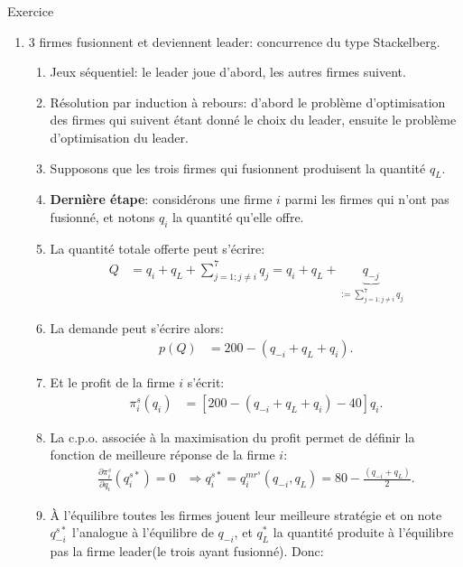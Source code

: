 \begin{frame}[allowframebreaks]{Exercice}
\begin{enumerate}
        \item 3 firmes fusionnent et deviennent leader: concurrence du type Stackelberg. 
        \begin{enumerate}[$\star$]
            \item Jeux séquentiel: le leader joue d'abord, les autres firmes suivent. 
            \item Résolution par induction à rebours: d'abord le problème d'optimisation 
            des firmes qui suivent étant donné le choix du leader, ensuite le problème d'optimisation
            du leader.
            \item Supposons que les trois firmes qui fusionnent produisent la quantité $q_L$. 
            \item \textbf{Dernière étape}: considérons une firme $i$ parmi les firmes qui n'ont pas fusionné, 
            et notons $q_i$ la quantité qu'elle offre. 
            \item La quantité totale offerte peut s'écrire:
            \begin{align*}
                Q&= q_i + q_L + \sum_{j=1; j\neq i}^7 q_j =  q_i + q_L + \underbrace{q_{-j}}_{:=\sum_{j=1; j\neq i}^7 q_j}
            \end{align*}
            \item La demande peut s'écrire alors:
            \begin{align*}
                p(Q) &= 200 - ( q_{-i} + q_L + q_i ).
            \end{align*}
            \item Et le profit de la firme $i$ s'écrit:
            \begin{align*}
                \pi_i^s(q_i) &=  \left[200 - ( q_{-i} + q_L + q_i ) - 40\right]q_i.
            \end{align*}
            \item La c.p.o. associée à la maximisation du profit permet de définir la fonction
            de meilleure réponse de la firme $i$:
            \begin{align*}
             \frac{\partial \pi_i^s}{\partial q_i}(q_i^{s*}) = 0 &\Rightarrow 
             q_i^{s*} = q_i^{mr^s}(q_{-i}, q_L) = 80 - \frac{(q_{-i} + q_L)}{2}.
             \end{align*}
             \item À l'équilibre toutes les firmes jouent leur meilleure stratégie et on note 
             $q_{-i}^{s*}$ l'analogue à l'équilibre de $q_{-i}$, et $q_L^*$ la quantité produite 
             à l'équilibre pas la firme leader(le trois ayant fusionné). Donc:

\end{enumerate}
\end{enumerate}
\end{frame}
